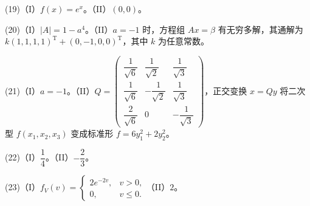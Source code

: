 \documentclass[UTF8,12pt]{ctexart}
\begin{document}
(19)（I）\(\displaystyle f(x)=e^x\)。（II）\(\displaystyle (0,\allowbreak 0)\)。


(20)（I）\(\displaystyle |A|=1-a^4\)。（II）\(\displaystyle a=-1\) 时，方程组 \(\displaystyle Ax=\beta\) 有无穷多解，其通解为 \(\displaystyle k(1,\allowbreak 1,\allowbreak 1,\allowbreak 1)^{\mathrm T}+(0,\allowbreak -1,\allowbreak 0,\allowbreak 0)^{\mathrm T}\)，其中 \(\displaystyle k\) 为任意常数。


(21)（I）\(\displaystyle a=-1\)。（II）\(\displaystyle Q=\begin{pmatrix}\dfrac{\displaystyle 1}{\displaystyle \sqrt6}&\dfrac{\displaystyle 1}{\displaystyle \sqrt2}&\dfrac{\displaystyle 1}{\displaystyle \sqrt3}\\\dfrac{\displaystyle 1}{\displaystyle \sqrt6}&-\dfrac{\displaystyle 1}{\displaystyle \sqrt2}&\dfrac{\displaystyle 1}{\displaystyle \sqrt3}\\\dfrac{\displaystyle 2}{\displaystyle \sqrt6}&0&-\dfrac{\displaystyle 1}{\displaystyle \sqrt3}\end{pmatrix}\)，正交变换 \(\displaystyle x=Qy\) 将二次型 \(\displaystyle f(x_1,\allowbreak x_2,\allowbreak x_3)\) 变成标准形 \(\displaystyle f=6y_1^2+2y_2^2\)。


(22)（I）\(\displaystyle \dfrac{\displaystyle 1}{\displaystyle 4}\)。（II）\(\displaystyle -\dfrac{\displaystyle 2}{\displaystyle 3}\)。


(23)（I）\(\displaystyle f_V(v)=\begin{cases}2e^{-2v},\allowbreak &v>0,\allowbreak \\0,\allowbreak &v\leq0.\end{cases}\)（II）\(\displaystyle 2\)。


\clearpage
\end{document}
